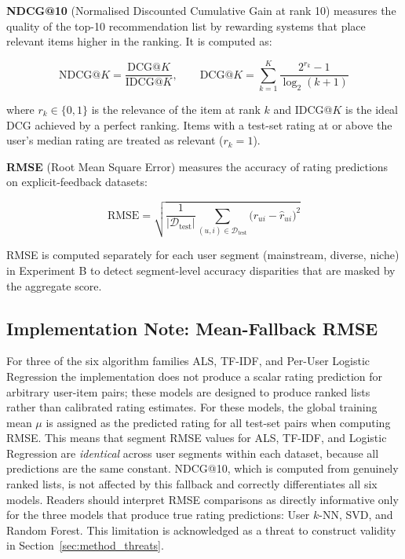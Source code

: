 \documentclass[11pt,a4paper]{report}
\begin{document}
\textbf{NDCG@10} (Normalised Discounted Cumulative Gain at rank 10) \citep{jarvelin2002cumulated} measures the quality of the top-10 recommendation list by rewarding systems that place relevant items higher in the ranking. It is computed as:

\begin{equation}
\textrm{NDCG@}K = \frac{\textrm{DCG@}K}{\textrm{IDCG@}K}, \qquad \textrm{DCG@}K = \sum_{k=1}^{K} \frac{2^{r_k} - 1}{\log_2(k+1)}
\end{equation}

where $r_k \in \{0,1\}$ is the relevance of the item at rank $k$ and IDCG@$K$ is the ideal DCG achieved by a perfect ranking. Items with a test-set rating at or above the user's median rating are treated as relevant ($r_k = 1$).

\textbf{RMSE} (Root Mean Square Error) measures the accuracy of rating predictions on explicit-feedback datasets:

\begin{equation}
\textrm{RMSE} = \sqrt{\frac{1}{|\mathcal{D}_\text{test}|} \sum_{(u,i) \in \mathcal{D}_\text{test}} \bigl(r_{ui} - \hat{r}_{ui}\bigr)^2}
\end{equation}

RMSE is computed separately for each user segment (mainstream, diverse, niche) in Experiment B to detect segment-level accuracy disparities that are masked by the aggregate score.

\subsection*{Implementation Note: Mean-Fallback RMSE}
\label{sec:method_rmse_caveat}

For three of the six algorithm families ALS, TF-IDF, and Per-User Logistic Regression the implementation does not produce a scalar rating prediction for arbitrary user-item pairs; these models are designed to produce ranked lists rather than calibrated rating estimates. For these models, the global training mean $\mu$ is assigned as the predicted rating for all test-set pairs when computing RMSE. This means that segment RMSE values for ALS, TF-IDF, and Logistic Regression are \emph{identical} across user segments within each dataset, because all predictions are the same constant. NDCG@10, which is computed from genuinely ranked lists, is not affected by this fallback and correctly differentiates all six models. Readers should interpret RMSE comparisons as directly informative only for the three models that produce true rating predictions: User $k$-NN, SVD, and Random Forest. This limitation is acknowledged as a threat to construct validity in Section~\ref{sec:method_threats}.
\end{document}
